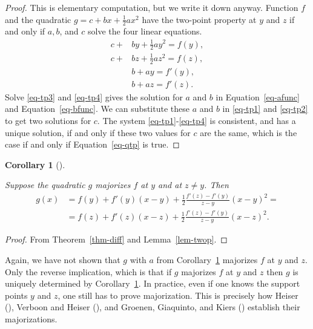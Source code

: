 \documentclass[
  12pt,
  letterpaper,
  DIV=11,
  numbers=noendperiod]{scrartcl}
\theoremstyle{definition}
\theoremstyle{definition}
\theoremstyle{plain}
\newtheorem{corollary}{Corollary}[section]
\theoremstyle{plain}
\theoremstyle{plain}
\theoremstyle{remark}
\begin{document}
\begin{proof}
This is elementary computation, but we write it down anyway. Function
\(f\) and the quadratic \(g=c+bx+\frac12ax^2\) have the two-point
property at \(y\) and \(z\) if and only if \(a, b\), and \(c\) solve the
four linear equations. \begin{subequations}
\begin{align}
c+&by+\frac12ay^2=f(y),\label{eq-tp1}\\
c+&bz+\frac12az^2=f(z),\label{eq-tp2}\\
&b+ay=f'(y),\label{eq-tp3}\\
&b+az=f'(z).\label{eq-tp4}
\end{align}
\end{subequations} Solve \eqref{eq-tp3} and \eqref{eq-tp4} gives the
solution for \(a\) and \(b\) in Equation~\ref{eq-afunc} and
Equation~\ref{eq-bfunc}. We can substitute these \(a\) and \(b\) in
\eqref{eq-tp1} and \eqref{eq-tp2} to get two solutions for \(c\). The
system \eqref{eq-tp1}-\eqref{eq-tp4} is consistent, and has a unique
solution, if and only if these two values for \(c\) are the same, which
is the case if and only if Equation~\ref{eq-qtp} is true.
\end{proof}

\begin{corollary}[]\protect\hypertarget{cor-twop}{}\label{cor-twop}

Suppose the quadratic \(g\) majorizes \(f\) at \(y\) and at
\(z\not= y\). Then \begin{align}
g(x)&=f(y)+f'(y)(x-y)+\frac12\frac{f'(z)-f'(y)}{z-y}(x-y)^2=\\
&=f(z)+f'(z)(x-z)+\frac12\frac{f'(z)-f'(y)}{z-y}(x-z)^2.
\end{align}

\end{corollary}

\begin{proof}
From Theorem~\ref{thm-diff} and Lemma~\ref{lem-twop}.
\end{proof}

Again, we have not shown that \(g\) with \(a\) from
Corollary~\ref{cor-twop} majorizes \(f\) at \(y\) and \(z\). Only the
reverse implication, which is that if \(g\) majorizes \(f\) at \(y\) and
\(z\) then \(g\) is uniquely determined by Corollary~\ref{cor-twop}. In
practice, even if one knows the support points \(y\) and \(z\), one
still has to prove majorization. This is precisely how Heiser
(), Verboon and Heiser
(), and Groenen, Giaquinto, and
Kiers () establish their
majorizations.
\end{document}
